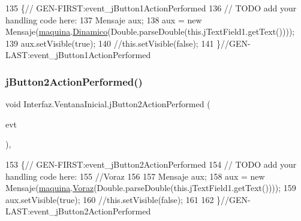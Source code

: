 \begin{DoxyCode}
135                                                                          \{\textcolor{comment}{//
      GEN-FIRST:event\_jButton1ActionPerformed}
136         \textcolor{comment}{// TODO add your handling code here:}
137         Mensaje aux;
138         aux = \textcolor{keyword}{new} Mensaje(\mbox{\hyperlink{class_interfaz_1_1_ventana_inicial_a906577f94c1548333c5f598012939378}{maquina}}.\mbox{\hyperlink{classalgoritmia2_1_1_algoritmos_a2c967334e82887c7721130ef06e4fe7c}{Dinamico}}(Double.parseDouble(\textcolor{keyword}{this}.jTextField1.getText())));
139         aux.setVisible(\textcolor{keyword}{true});
140         \textcolor{comment}{//this.setVisible(false);}
141     \}\textcolor{comment}{//GEN-LAST:event\_jButton1ActionPerformed}
\end{DoxyCode}
\mbox{\label{class_interfaz_1_1_ventana_inicial_a979092d824f639fd81891bcdf5351cbb}} 
\subsubsection{\texorpdfstring{j\+Button2\+Action\+Performed()}{jButton2ActionPerformed()}}
{\footnotesize\ttfamily void Interfaz.\+Ventana\+Inicial.\+j\+Button2\+Action\+Performed (\begin{DoxyParamCaption}\item[{java.\+awt.\+event.\+Action\+Event}]{evt }\end{DoxyParamCaption})\hspace{0.3cm}{\ttfamily [inline]}, {\ttfamily [private]}}


\begin{DoxyCode}
153                                                                          \{\textcolor{comment}{//
      GEN-FIRST:event\_jButton2ActionPerformed}
154         \textcolor{comment}{// TODO add your handling code here:}
155         \textcolor{comment}{//Voraz}
156 
157         Mensaje aux;
158         aux = \textcolor{keyword}{new} Mensaje(\mbox{\hyperlink{class_interfaz_1_1_ventana_inicial_a906577f94c1548333c5f598012939378}{maquina}}.\mbox{\hyperlink{classalgoritmia2_1_1_algoritmos_a5bfcbe069e929caf3bfd11e8eedbda43}{Voraz}}(Double.parseDouble(\textcolor{keyword}{this}.jTextField1.getText())));
159         aux.setVisible(\textcolor{keyword}{true});
160         \textcolor{comment}{//this.setVisible(false);}
161      
162     \}\textcolor{comment}{//GEN-LAST:event\_jButton2ActionPerformed}
\end{DoxyCode}
\mbox{\label{class_interfaz_1_1_ventana_inicial_a8b32a9edce9bedd6164369c723fc6528}} 
